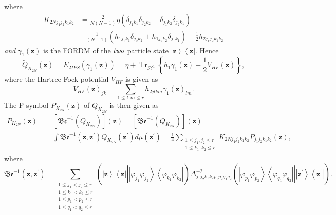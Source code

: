 \documentclass[aps,preprint]{revtex4}%
\begin{document}
where%
\begin{align}
K_{2Nj_{1}j_{2}k_{1}k_{2}}  &  =\frac{2}{N\left(  N-1\right)  }\eta\left(
\delta_{j_{1}k_{1}}\delta_{j_{2}k_{2}}-\delta_{j_{1}k_{2}}\delta_{j_{2}k_{1}%
}\right) \nonumber\\
&  +\frac{1}{\left(  N-1\right)  }\left(  h_{1j_{1}k_{1}}\delta_{j_{2}k_{2}%
}+h_{1j_{2}k_{2}}\delta_{j_{1}k_{1}}\right)  +\frac{1}{2}h_{2j_{1}j_{2}%
k_{1}k_{2}}%
\end{align}
\emph{and }$\gamma_{1}\left(  \mathbf{z}\right)  $ is the FORDM of the
$\emph{two}$ particle state $\left\vert \mathbf{z}\right\rangle \left\langle
\mathbf{z}\right\vert .$ Hence
\begin{equation}
\tilde{Q}_{K_{2N}}\left(  \mathbf{z}\right)  =E_{2IPS}\left(  \gamma
_{1}\left(  \mathbf{z}\right)  \right)  =\eta+\operatorname*{Tr}%
\nolimits_{\mathcal{H}^{1}}\left\{  h_{1}\gamma_{1}\left(  \mathbf{z}\right)
-\frac{1}{2}V_{HF}\left(  \mathbf{z}\right)  \right\}  ,
\end{equation}
where the Hartree-Fock potential $V_{HF}$ is given as
\begin{equation}
V_{HF}\left(  \mathbf{z}\right)  _{jk}=\sum_{1\leq l,m\leq r}h_{2jlkm}%
\gamma_{1}\left(  \mathbf{z}\right)  _{lm}.
\end{equation}
The P-symbol $P_{K_{2N}}\left(  \mathbf{z}\right)  $ of $Q_{K_{2N}}$ is then
given as
\begin{align}
P_{K_{2N}}\left(  \mathbf{z}\right)   &  =\left[  \mathfrak{Be}^{-1}\left(
Q_{K_{2N}}\right)  \right]  \left(  \mathbf{z}\right)  =\left[  \mathfrak{Be}%
^{-1}\left(  Q_{K_{2N}}\right)  \right]  \left(  \mathbf{z}\right) \nonumber\\
&  =\int\mathfrak{Be}^{-1}\left(  \mathbf{z,z}^{\prime}\right)  Q_{K_{2N}%
}\left(  \mathbf{z}^{\prime}\right)  d\mu\left(  \mathbf{z}^{\prime}\right)
=\frac{1}{4}\sum_{\substack{1\leq j_{1},j_{2}\leq r\\1\leq k_{1},k_{2}\leq
r}}K_{2Nj_{1}j_{2}k_{1}k_{2}}P_{j_{1}j_{2}k_{1}k_{2}}\left(  \mathbf{z}%
\right)  ,
\end{align}
where
\begin{equation}
\mathfrak{Be}^{-1}\left(  \mathbf{z,z}^{\prime}\right)  =\sum_{\substack{1\leq
j_{1}<j_{2}\leq r\\1\leq k_{1}<k_{2}\leq r\\1\leq p_{1}<p_{2}\leq r\\1\leq
q_{1}<q_{2}\leq r}}\left(  \left\vert \mathbf{z}\right\rangle \left\langle
\mathbf{z}\right\vert \left\vert \overset{}{\left\vert \varphi_{j_{1}}%
\varphi_{j_{2}}\right\rangle \left\langle \varphi_{k_{1}}\varphi_{k_{2}%
}\right\vert }\right.  \right)  \Delta_{j_{1}j_{2}k_{1}k_{2}p_{1}p_{2}%
q_{1}q_{2}}^{-2}\left(  \left.  \overset{}{\left\vert \varphi_{p_{1}}%
\varphi_{p_{2}}\right\rangle \left\langle \varphi_{q_{1}}\varphi_{q_{2}%
}\right\vert }\right\vert \left\vert \mathbf{z}^{\prime}\right\rangle
\left\langle \mathbf{z}^{\prime}\right\vert \right)  .
\end{equation}
\end{document}
